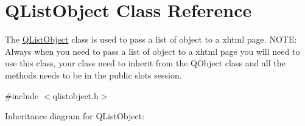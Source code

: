 \hypertarget{class_q_list_object}{}\section{Q\+List\+Object Class Reference}
\label{class_q_list_object}


The \mbox{\hyperlink{class_q_list_object}{Q\+List\+Object}} class is used to pass a list of object to a xhtml page. N\+O\+TE\+: Always when you need to pass a list of object to a xhtml page you will need to use this class, your class need to inherit from the Q\+Object class and all the methods needs to be in the public slots session.  




{\ttfamily \#include $<$qlistobject.\+h$>$}



Inheritance diagram for Q\+List\+Object\+:
